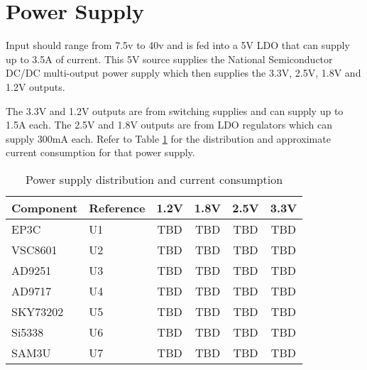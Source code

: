 \section{Power Supply} %
    
    Input should range from 7.5v to 40v and is fed into a 5V LDO that can supply up to 3.5A of current.
    This 5V source supplies the National Semiconductor DC/DC multi-output power supply which then supplies
    the 3.3V, 2.5V, 1.8V and 1.2V outputs.
    
    The 3.3V and 1.2V outputs are from switching supplies and can supply up to 1.5A each.  The 2.5V and 1.8V
    outputs are from LDO regulators which can supply 300mA each.  Refer to Table \ref{table:PowerSupplies} for 
    the distribution and approximate current consumption for that power supply.
    
    \begin{table}[here,center]
        \begin{center}
            \begin{tabular}{|l|l|c|c|c|c|}
                \hline
                Component   & Reference & 1.2V  & 1.8V  & 2.5V  & 3.3V  \\ 
                \hline \hline
                EP3C        & U1        & TBD   & TBD   & TBD   & TBD   \\ 
                \hline
                VSC8601     & U2        & TBD   & TBD   & TBD   & TBD   \\ 
                \hline
                AD9251      & U3        & TBD   & TBD   & TBD   & TBD   \\ 
                \hline
                AD9717      & U4        & TBD   & TBD   & TBD   & TBD   \\ 
                \hline
                SKY73202    & U5        & TBD   & TBD   & TBD   & TBD   \\ 
                \hline
                Si5338      & U6        & TBD   & TBD   & TBD   & TBD   \\ 
                \hline
                SAM3U       & U7        & TBD   & TBD   & TBD   & TBD   \\ 
                \hline
            \end{tabular}
            \caption{Power supply distribution and current consumption}
            \label{table:PowerSupplies}
        \end{center}
    \end{table}
    
